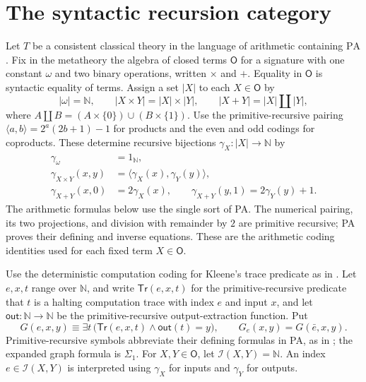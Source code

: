 \documentclass[11pt]{article}
\newcommand{\N}{\mathbb N}
\newcommand{\PA}{\mathrm{PA}}
\begin{document}
\section{The syntactic recursion category}\label{sec:syntactic}

Let $T$ be a consistent classical theory in the language of arithmetic
containing $\PA$. Fix in the metatheory the algebra of closed terms
$\mathsf O$ for a signature with one constant $\omega$ and two
binary operations, written $\times$ and $+$. Equality in $\mathsf O$
is syntactic equality of terms. Assign a set $|X|$ to each
$X\in\mathsf O$ by
\[
 |\omega|=\N,\qquad
 |X\times Y|=|X|\times|Y|,\qquad
 |X+Y|=|X|\amalg|Y|,
\]
where $A\amalg B=(A\times\{0\})\cup(B\times\{1\})$.
Use the primitive-recursive pairing
$\langle a,b\rangle=2^a(2b+1)-1$ for products and the even and
odd codings for coproducts. These determine recursive bijections
$\gamma_X:|X|\to\N$ by
\[
 \begin{aligned}
 \gamma_\omega&=1_\N,\\
 \gamma_{X\times Y}(x,y)
   &=\langle\gamma_X(x),\gamma_Y(y)\rangle,\\
 \gamma_{X+Y}(x,0)&=2\gamma_X(x),\qquad
 \gamma_{X+Y}(y,1)=2\gamma_Y(y)+1.
 \end{aligned}
\]
The arithmetic formulas below use the single sort of PA.
The numerical pairing, its two projections, and division with
remainder by $2$ are primitive recursive; PA proves their defining
and inverse equations. These are the arithmetic coding identities
used for each fixed term $X\in\mathsf O$.

Use the deterministic computation coding for Kleene's trace
predicate as in \cite[p.~115, Note~1]{Montagna}.
Let $e,x,t$ range over $\N$, and write
$\mathsf{Tr}(e,x,t)$ for the primitive-recursive predicate
that $t$ is a halting computation trace with index $e$ and input
$x$, and let $\mathsf{out}:\N\to\N$ be the primitive-recursive
output-extraction function. Put
\[
 G(e,x,y)\equiv
 \exists t\,\bigl(\mathsf{Tr}(e,x,t)\land\mathsf{out}(t)=y\bigr),
 \qquad G_e(x,y)=G(\bar e,x,y).
\]
Primitive-recursive symbols abbreviate their defining formulas in
PA, as in \cite[p.~644]{DPM}; the expanded graph formula is $\Sigma_1$.
For $X,Y\in\mathsf O$, let $\mathcal I(X,Y)=\N$.
An index $e\in\mathcal I(X,Y)$ is interpreted using
$\gamma_X$ for inputs and $\gamma_Y$ for outputs.
\end{document}
